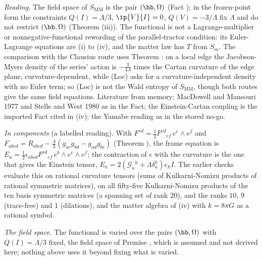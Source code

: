 \emph{Reading.} The field space of $S_{\mathrm{MM}}$ is the pair $(\hb, \Omega)$ (Fact ); in the frozen-point form the constraints $Q(I) = \Lambda/3$, $\ip{V}{I} = 0$, $Q(V) = -3/\Lambda$ fix $\Lambda$ and do not restrict $(\hb, \Omega)$ (Theorem (iii)). The functional is not a Lagrange-multiplier or nonnegative-functional rewording of the parallel-tractor condition: its Euler-Lagrange equations are (i) to (iv), and the matter law has $T$ from $S_{m}$. The comparison with the Clausius route uses Theorem : on a local edge the Jacobson-Myers density of the series' action is $-\tfrac{3}{4\Lambda}$ times the Cartan curvature of the edge plane, curvature-dependent, while (Loc) asks for a curvature-independent density with no Euler term; so (Loc) is not the Wald entropy of $S_{\mathrm{MM}}$, though both routes give the same field equations. Literature from memory: MacDowell and Mansouri 1977 and Stelle and West 1980 as in the Fact; the Einstein-Cartan coupling is the imported Fact cited in (iv); the Yamabe reading as in the stored no-go.

\emph{In components} (a labelled reading). With $F^{cd} = \tfrac12 F^{cd}{}_{ef}\,e^{e}\wedge e^{f}$ and $F_{abcd} = R_{abcd} - \tfrac{\Lambda}{3}(g_{ac}g_{bd} - g_{ad}g_{bc})$ (Theorem ), the frame equation is $E_{a} = \tfrac12\epsilon_{abcd}F^{cd}{}_{ef}\,e^{b}\wedge e^{e}\wedge e^{f}$; the contraction of $\epsilon$ with the curvature is the one that gives the Einstein tensor, $E_{a} = 2(\mathcal{G}_{a}{}^{h} + \Lambda\delta_{a}^{h})e_{h}I$. The earlier checks evaluate this on rational curvature tensors (sums of Kulkarni-Nomizu products of rational symmetric matrices), on all fifty-five Kulkarni-Nomizu products of the ten basis symmetric matrices (a spanning set of rank $20$), and the ranks $10$, $9$ (trace-free) and $1$ (dilations), and the matter algebra of (iv) with $k = 8\pi G$ as a rational symbol.

\emph{The field space.} The functional is varied over the pairs $(\hb, \Omega)$ with $Q(I) = \Lambda/3$ fixed, the field space of Premise , which is assumed and not derived here; nothing above uses it beyond fixing what is varied.
